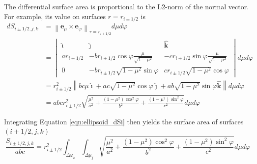 The differential surface area is proportional to the L2-norm of the normal vector. For example, its value on surfaces $r = r_{i\pm1/2}$ is
\begin{subequations}
    \begin{align}
        dS_{i \pm 1/2,j,k} &= \left\lVert \mathbf{e}_\mu \times \mathbf{e}_\varphi \right\rVert _{r=r_{i\pm1/2}} d\mu d\varphi \\
        &= \begin{vmatrix}
            \bm{\hat{\imath}} & \bm{\hat{\jmath}} & \bm{\hat{k}} \\
            ar_{i\pm1/2} & \displaystyle -br_{i\pm1/2}\cos\varphi\frac{\mu}{\sqrt{1-\mu^2}} & \displaystyle -cr_{i\pm1/2}\sin\varphi\frac{\mu}{\sqrt{1-\mu^2}} \\
            0 & -br_{i\pm1/2}\sqrt{1-\mu^2} \sin\varphi & cr_{i\pm1/2}\sqrt{1-\mu^2} \cos\varphi
        \end{vmatrix} d\mu d\varphi \\
        &= r_{i\pm1/2}^2 \left\lVert bc\mu \bm{\hat{\imath}} + ac\sqrt{1-\mu^2}\cos\varphi \bm{\hat{\jmath}} + ab\sqrt{1-\mu^2}\sin\varphi \bm{\hat{k}} \right\rVert d\mu d\varphi \\
        &= abc r_{i\pm1/2}^2 \sqrt{\frac{\mu^2}{a^2} + \frac{(1-\mu^2)\cos^2\varphi}{b^2} + \frac{(1-\mu^2)\sin^2\varphi}{c^2}} d\mu d\varphi
        \label{eqn:ellipsoid_dSi}
    \end{align}    
\end{subequations}

Integrating Equation \ref{eqn:ellipsoid_dSi} then yields the surface area of surfaces $(i+1/2,j,k)$
\begin{equation}
    \frac{S_{i \pm 1/2,j,k}}{abc} = r_{i\pm1/2}^2 \int_{\Delta\varphi_k} \int_{\Delta\mu_j} \sqrt{\frac{\mu^2}{a^2} + \frac{(1-\mu^2)\cos^2\varphi}{b^2} + \frac{(1-\mu^2)\sin^2\varphi}{c^2}} d\mu d\varphi
    \label{eqn:ellipsoid_Si}
\end{equation}

